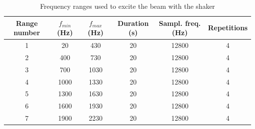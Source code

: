 \documentclass[11pt,a4paper]{article}
\begin{document}
\begin{table}[h]
	\centering
	\begin{tabular}{c c c c c c} 
		\toprule
		Range number & $f_{min}$ (Hz) & $f_{max}$ (Hz) & Duration (s) & Sampl. freq. (Hz) & Repetitions \\ 
		\midrule	    		   	    		
		1 & 20 	 & 430 	& 20 & 12800 & 4 \\	
		2 & 400  & 730 	& 20 & 12800 & 4 \\
		3 & 700  & 1030 & 20 & 12800 & 4 \\
		4 & 1000 & 1330 & 20 & 12800 & 4 \\
		5 & 1300 & 1630 & 20 & 12800 & 4 \\
		6 & 1600 & 1930 & 20 & 12800 & 4 \\
		7 & 1900 & 2230 & 20 & 12800 & 4 \\
		\bottomrule
	\end{tabular}
	\caption{Frequency ranges used to excite the beam with the shaker}
\end{table}  
\end{document}
